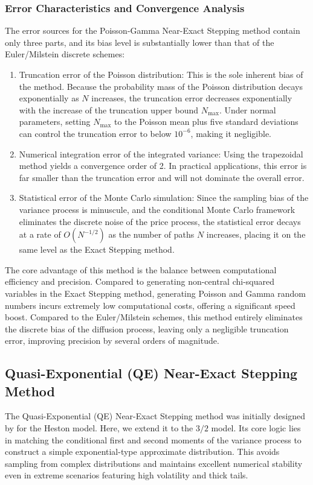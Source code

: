 \subsubsection{Error Characteristics and Convergence Analysis}
The error sources for the Poisson-Gamma Near-Exact Stepping method contain only three parts, and its bias level is substantially lower than that of the Euler/Milstein discrete schemes:
\begin{enumerate}
  \item Truncation error of the Poisson distribution: This is the sole inherent bias of the method. Because the probability mass of the Poisson distribution decays exponentially as $N$ increases, the truncation error decreases exponentially with the increase of the truncation upper bound $N_{\max}$. Under normal parameters, setting $N_{\max}$ to the Poisson mean plus five standard deviations can control the truncation error to below $10^{-6}$, making it negligible.
  \item Numerical integration error of the integrated variance: Using the trapezoidal method yields a convergence order of 2. In practical applications, this error is far smaller than the truncation error and will not dominate the overall error.
  \item Statistical error of the Monte Carlo simulation: Since the sampling bias of the variance process is minuscule, and the conditional Monte Carlo framework eliminates the discrete noise of the price process, the statistical error decays at a rate of $O(N^{-1/2})$ as the number of paths $N$ increases, placing it on the same level as the Exact Stepping method.
\end{enumerate}
The core advantage of this method is the balance between computational efficiency and precision. Compared to generating non-central chi-squared variables in the Exact Stepping method, generating Poisson and Gamma random numbers incurs extremely low computational costs, offering a significant speed boost. Compared to the Euler/Milstein schemes, this method entirely eliminates the discrete bias of the diffusion process, leaving only a negligible truncation error, improving precision by several orders of magnitude.

\subsection{Quasi-Exponential (QE) Near-Exact Stepping Method}
The Quasi-Exponential (QE) Near-Exact Stepping method was initially designed by \citet{andersenEfficientSimulationHeston2007} for the Heston model. Here, we extend it to the $3/2$ model. Its core logic lies in matching the conditional first and second moments of the variance process to construct a simple exponential-type approximate distribution. This avoids sampling from complex distributions and maintains excellent numerical stability even in extreme scenarios featuring high volatility and thick tails.

